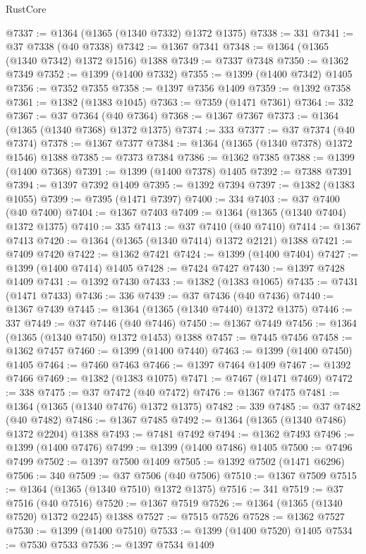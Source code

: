 \begin{lexlean}{RustCore}
\begin{coremodule}
@7337 := @1364 (@1365 (@1340 @7332) @1372 @1375)
@7338 := 331
@7341 := @37 @7338 (@40 @7338)
@7342 := @1367 @7341
@7348 := @1364 (@1365 (@1340 @7342) @1372 @1516) @1388
@7349 := @7337 @7348
@7350 := @1362 @7349
@7352 := @1399 (@1400 @7332)
@7355 := @1399 (@1400 @7342) @1405
@7356 := @7352 @7355
@7358 := @1397 @7356 @1409
@7359 := @1392 @7358
@7361 := @1382 (@1383 @1045)
@7363 := @7359 (@1471 @7361)
@7364 := 332
@7367 := @37 @7364 (@40 @7364)
@7368 := @1367 @7367
@7373 := @1364 (@1365 (@1340 @7368) @1372 @1375)
@7374 := 333
@7377 := @37 @7374 (@40 @7374)
@7378 := @1367 @7377
@7384 := @1364 (@1365 (@1340 @7378) @1372 @1546) @1388
@7385 := @7373 @7384
@7386 := @1362 @7385
@7388 := @1399 (@1400 @7368)
@7391 := @1399 (@1400 @7378) @1405
@7392 := @7388 @7391
@7394 := @1397 @7392 @1409
@7395 := @1392 @7394
@7397 := @1382 (@1383 @1055)
@7399 := @7395 (@1471 @7397)
@7400 := 334
@7403 := @37 @7400 (@40 @7400)
@7404 := @1367 @7403
@7409 := @1364 (@1365 (@1340 @7404) @1372 @1375)
@7410 := 335
@7413 := @37 @7410 (@40 @7410)
@7414 := @1367 @7413
@7420 := @1364 (@1365 (@1340 @7414) @1372 @2121) @1388
@7421 := @7409 @7420
@7422 := @1362 @7421
@7424 := @1399 (@1400 @7404)
@7427 := @1399 (@1400 @7414) @1405
@7428 := @7424 @7427
@7430 := @1397 @7428 @1409
@7431 := @1392 @7430
@7433 := @1382 (@1383 @1065)
@7435 := @7431 (@1471 @7433)
@7436 := 336
@7439 := @37 @7436 (@40 @7436)
@7440 := @1367 @7439
@7445 := @1364 (@1365 (@1340 @7440) @1372 @1375)
@7446 := 337
@7449 := @37 @7446 (@40 @7446)
@7450 := @1367 @7449
@7456 := @1364 (@1365 (@1340 @7450) @1372 @1453) @1388
@7457 := @7445 @7456
@7458 := @1362 @7457
@7460 := @1399 (@1400 @7440)
@7463 := @1399 (@1400 @7450) @1405
@7464 := @7460 @7463
@7466 := @1397 @7464 @1409
@7467 := @1392 @7466
@7469 := @1382 (@1383 @1075)
@7471 := @7467 (@1471 @7469)
@7472 := 338
@7475 := @37 @7472 (@40 @7472)
@7476 := @1367 @7475
@7481 := @1364 (@1365 (@1340 @7476) @1372 @1375)
@7482 := 339
@7485 := @37 @7482 (@40 @7482)
@7486 := @1367 @7485
@7492 := @1364 (@1365 (@1340 @7486) @1372 @2204) @1388
@7493 := @7481 @7492
@7494 := @1362 @7493
@7496 := @1399 (@1400 @7476)
@7499 := @1399 (@1400 @7486) @1405
@7500 := @7496 @7499
@7502 := @1397 @7500 @1409
@7505 := @1392 @7502 (@1471 @6296)
@7506 := 340
@7509 := @37 @7506 (@40 @7506)
@7510 := @1367 @7509
@7515 := @1364 (@1365 (@1340 @7510) @1372 @1375)
@7516 := 341
@7519 := @37 @7516 (@40 @7516)
@7520 := @1367 @7519
@7526 := @1364 (@1365 (@1340 @7520) @1372 @2245) @1388
@7527 := @7515 @7526
@7528 := @1362 @7527
@7530 := @1399 (@1400 @7510)
@7533 := @1399 (@1400 @7520) @1405
@7534 := @7530 @7533
@7536 := @1397 @7534 @1409

\end{coremodule}
\end{lexlean}
